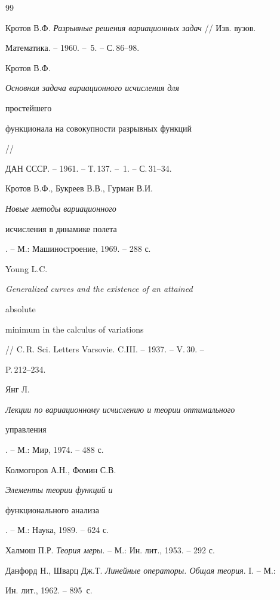 \begin{thebibliography}{99}


Кротов В.Ф. {\em Разрывные решения вариационных задач} // Изв. вузов. 


Математика. -- 1960. -- \No\,5. -- С.\,86--98.




Кротов В.Ф. {\em Основная задача вариационного исчисления для 


простейшего 


функционала на совокупности разрывных функций} // 


ДАН СССР. -- 1961. -- Т.\,137. -- \No\,1. -- С.\,31--34. 




Кротов В.Ф., Букреев В.В., Гурман В.И. {\em Новые методы вариационного 


исчисления в динамике полета}. -- М.: Машиностроение, 1969. -- 288 с. 




Young L.C. {\em Generalized curves and the existence of an attained 


absolute 


minimum in the calculus of variations} 


// C.\,R. Sci. Letters Varsovie. C.III. -- 1937. -- V.\,30. -- 


P.\,212--234. 




Янг Л. {\em Лекции по вариационному исчислению и теории оптимального 


управления}. -- М.: Мир, 1974. -- 488 с. 




Колмогоров А.Н., Фомин С.В. {\em Элементы теории функций и 


функционального анализа}. -- М.: Наука, 1989. -- 624 с. 




Халмош П.Р. {\em Теория меры}. -- М.: Ин. лит., 1953. -- 292 с. 




Данфорд H., Шварц Дж.Т. {\em Линейные операторы. Общая теория}. I. -- М.: 


Ин. лит., 1962. -- 895~с. 


 


\end{thebibliography} 


 


\vskip 0.5cm 


 






 


\label{end} 


 


 


